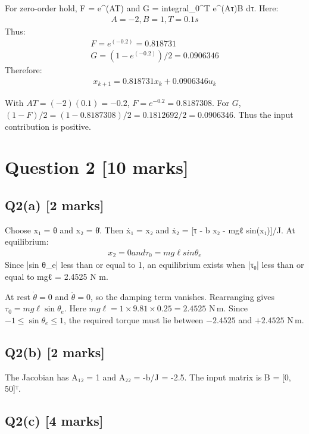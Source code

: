\documentclass[11pt,a4paper]{article}
\begin{document}
For zero-order hold, F = e\textasciicircum{}(AT) and G = integral\_0\textasciicircum{}T e\textasciicircum{}(Aτ)B dτ.
Here:\[\begin{aligned}A = -2, B = 1, T = 0.1 s\end{aligned}\]
Thus:\[\begin{aligned}F = e^(-0.2) = 0.818731\\ G = (1-e^(-0.2))/2 = 0.0906346\end{aligned}\]
Therefore:\[\begin{aligned}x_{k+1} = 0.818731 x_k + 0.0906346 u_k\end{aligned}\]\par\smallskip With $AT=(-2)(0.1)=-0.2$, $F=e^{-0.2}=0.8187308$. For $G$, $(1-F)/2=(1-0.8187308)/2=0.1812692/2=0.0906346$. Thus the input contribution is positive.

\section*{Question 2 \hfill [10 marks]}
\subsection*{Q2(a) \hfill [2 marks]}

Choose x₁ = θ and x₂ = θ̇.
Then ẋ₁ = x₂ and ẋ₂ = [τ - b x₂ - mgℓ sin(x₁)]/J.
At equilibrium:\[\begin{aligned}x_2 = 0 and τ_0 = mg\ell sin \theta_e\end{aligned}\]
Since |sin θ\_e| less than or equal to 1, an equilibrium exists when |τ₀| less than or equal to mgℓ = 2.4525 N m.\par\smallskip At rest $\dot\theta=0$ and $\ddot\theta=0$, so the damping term vanishes. Rearranging gives $\tau_0=mg\ell\sin\theta_e$. Here $mg\ell=1\times9.81\times0.25=2.4525$ N\,m. Since $-1\leq\sin\theta_e\leq1$, the required torque must lie between $-2.4525$ and $+2.4525$ N\,m.

\subsection*{Q2(b) \hfill [2 marks]}

The Jacobian has A₁₂ = 1 and A₂₂ = -b/J = -2.5.
The input matrix is B = [0, 50]ᵀ.

\subsection*{Q2(c) \hfill [4 marks]}
\end{document}
